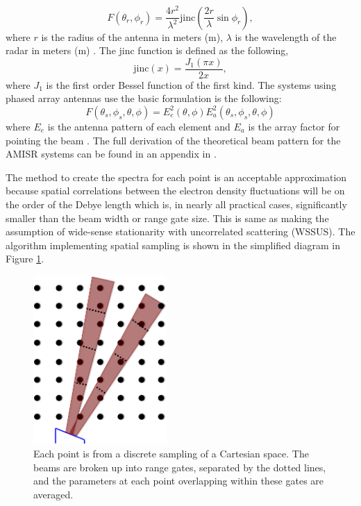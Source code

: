 \documentclass[draft,ras]{agutex}
\begin{document}
\begin{article}
\begin{equation}
\label{eqn:circantenna}
F(\theta_r,\phi_r)=\frac{4r^2}{\lambda^2}\text{jinc}\left(\frac{2r}{\lambda}\sin{\phi_r}\right),
\end{equation}
where $r$ is the radius of the antenna in meters (m), $\lambda$ is the wavelength of the radar in meters (m) \citep{Blahut:2004wd}. The jinc function is defined as the following,
\begin{equation}
\label{eqn:jinc}
\text{jinc}(x)=\frac{J_1(\pi x)}{2x},
\end{equation}
where $J_1$ is the first order Bessel function of the first kind. The systems using phased array antennas use the basic formulation is the following:
\begin{equation}
\label{eqn:phasdarr}
F(\theta_s,\phi_s,\theta,\phi)= E_e^2(\theta,\phi)E_a^2(\theta_s,\phi_s,\theta,\phi)
\end{equation}
where $E_e$ is the antenna pattern of each element and $E_a$ is the array factor for pointing the beam \citep{Balanis:2005:ATA:1208379}. The full derivation of the theoretical beam pattern for the AMISR systems can be found in an appendix in \citet{RDS:RDS20236}.


The method to create the spectra for each point is an acceptable approximation because spatial correlations between the electron density fluctuations will be on the order of the Debye length \citep{farley1969} which is, in nearly all practical cases, significantly smaller than the beam width or range gate size. This is same as making the assumption of wide-sense stationarity with uncorrelated scattering (WSSUS)\citep{Kailath:1962jx}. The algorithm implementing spatial sampling is shown in the simplified diagram in Figure \ref{fig:beamdia}.

\begin{figure}[!t]
\centering
\includegraphics[width=2in]{beamsampling}
\caption{Each point is from a discrete sampling of a Cartesian space. The beams are broken up into range gates, separated by the dotted lines, and the parameters at each point overlapping within these gates are averaged.}
\label{fig:beamdia}
\end{figure}
 

\end{article}
\end{document}
